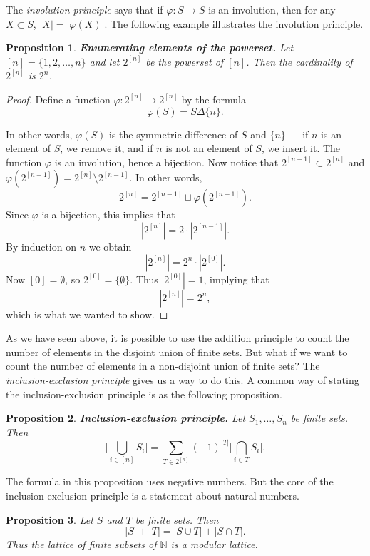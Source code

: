 \documentclass[12pt]{article}
\newtheorem{proposition}{Proposition}
\theoremstyle{remark}
\begin{document}
The \emph{involution principle} says that if $\varphi\colon S\to S$ is
an involution, then for any $X\subset S$, $|X|=|\varphi(X)|$.  The
following example illustrates the involution principle.

\begin{proposition} 
{\bf Enumerating elements of the powerset.}
Let $[n]=\{1,2,\dots,n\}$ and let $2^{[n]}$ be the powerset of $[n]$.
Then the cardinality of $2^{[n]}$ is $2^n$.
\end{proposition}

\begin{proof}
Define a function $\varphi\colon 2^{[n]}\to 2^{[n]}$ by the formula
\[
\varphi(S) = S\Delta\{n\}.
\]

In other words, $\varphi(S)$ is the symmetric difference of $S$ and
$\{n\}$ --- if $n$ is an element of $S$, we remove it, and if $n$ is
not an element of $S$, we insert it.  The function $\varphi$ is an
involution, hence a bijection.  Now notice that $2^{[n-1]}\subset
2^{[n]}$ and $\varphi(2^{[n-1]}) = 2^{[n]}\setminus 2^{[n-1]}$.  In
other words,
\[
2^{[n]} = 2^{[n-1]} \sqcup \varphi(2^{[n-1]}).
\]
Since $\varphi$ is a bijection, this implies that
\[
|2^{[n]}| = 2\cdot |2^{[n-1]}|.
\]
By induction on $n$ we obtain
\[
|2^{[n]}| = 2^n\cdot |2^{[0]}|.
\]
Now $[0] = \emptyset$, so $2^{[0]} = \{\emptyset\}$.  Thus
$|2^{[0]}|=1$, implying that
\[
|2^{[n]}| = 2^n,
\]
which is what we wanted to show.
\end{proof}

As we have seen above, it is possible to use the addition principle to
count the number of elements in the disjoint union of finite sets.
But what if we want to count the number of elements in a non-disjoint
union of finite sets?  The \emph{inclusion-exclusion principle} gives
us a way to do this.  A common way of stating the inclusion-exclusion
principle is as the following proposition.

\begin{proposition}
{\bf Inclusion-exclusion principle.}
Let $S_1,\dots, S_n$ be finite sets.  Then
\[
\biggl|\bigcup_{i\in[n]} S_i\biggr| = \sum_{T\in 2^{[n]}} (-1)^{|T|}\biggl|\bigcap_{i\in T} S_i\biggr|.
\]
\end{proposition}

The formula in this proposition uses negative numbers.  But the core
of the inclusion-exclusion principle is a statement about natural
numbers.

\begin{proposition}
Let $S$ and $T$ be finite sets.  Then
\[
|S|+|T| = |S\cup T| + |S\cap T|.
\]
Thus the lattice of finite subsets of $\mathbb{N}$ is a modular lattice.
\end{proposition}
\end{document}
